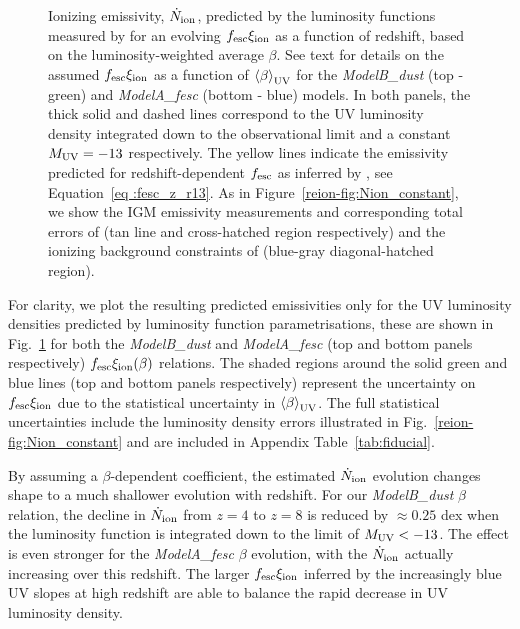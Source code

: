 \begin{figure}
  \caption[Ionizing emissivity, $\dot{N}_{\rm{ion}}$, predicted by the luminosity functions measured by \citet{2015ApJ...803...34B} for an evolving $f_{\rm{esc}}\xi_{\rm{ion}}$ as a function of redshift, based on the luminosity-weighted average $\beta$.]{Ionizing emissivity, $\dot{N}_{\rm{ion}}$, predicted by the luminosity functions measured by \citet{2015ApJ...803...34B} for an evolving $f_{\rm{esc}}\xi_{\rm{ion}}$ as a function of redshift, based on the luminosity-weighted average $\beta$. See text for details on the assumed $f_{\rm{esc}}\xi_{\rm{ion}}$ as a function of $\left \langle \beta  \right \rangle_{\rm{UV}}$ for the \emph{ModelB\_dust} (top - green) and \emph{ModelA\_fesc} (bottom - blue) models. In both panels, the thick solid and dashed lines correspond to the UV luminosity density integrated down to the observational limit and a constant $M_{\rm{UV}} = -13$ respectively. The yellow lines indicate the emissivity predicted for redshift-dependent $f_{\rm{esc}}$ as inferred by , see Equation~\ref{eq	:fesc_z_r13}. As in Figure~\ref{reion-fig:Nion_constant}, we show the IGM emissivity measurements and corresponding total errors of \citet{Becker:2013hc} (tan line and cross-hatched region respectively) and the ionizing background constraints of \citet{Bouwens:2015tm} (blue-gray diagonal-hatched region).}
  \label{reion-fig:Nion_xi_kappa_z}
\end{figure}

For clarity, we plot the resulting predicted emissivities only for the UV luminosity densities predicted by \citet{2015ApJ...803...34B} luminosity function parametrisations, these are shown in Fig.~\ref{reion-fig:Nion_xi_kappa_z} for both the \emph{ModelB\_dust} and \emph{ModelA\_fesc} (top and bottom panels respectively) $f_{\rm{esc}}\xi_{\rm{ion}}(\beta)$ relations. The shaded regions around the solid green and blue lines (top and bottom panels respectively) represent the uncertainty on $f_{\rm{esc}}\xi_{\rm{ion}}$ due to the statistical uncertainty in $\left \langle \beta  \right \rangle_{\rm{UV}}$. The full statistical uncertainties include the luminosity density errors illustrated in Fig.~\ref{reion-fig:Nion_constant} and are included in Appendix Table~\ref{tab:fiducial}.

By assuming a $\beta$-dependent coefficient, the estimated $\dot{N}_{\rm{ion}}$ evolution changes shape to a much shallower evolution with redshift. For our \emph{ModelB\_dust} $\beta$ relation, the decline in $\dot{N}_{\rm{ion}}$ from $z=4$ to $z=8$ is reduced by $\approx 0.25$ dex when the luminosity function is integrated down to the limit of $M_{\rm{UV}} < -13$. The effect is even stronger for the \emph{ModelA\_fesc} $\beta$ evolution, with the $\dot{N}_{\rm{ion}}$ actually increasing over this redshift. The larger $f_{\rm{esc}}\xi_{\rm{ion}}$ inferred by the increasingly blue UV slopes at high redshift are able to balance the rapid decrease in UV luminosity density.

